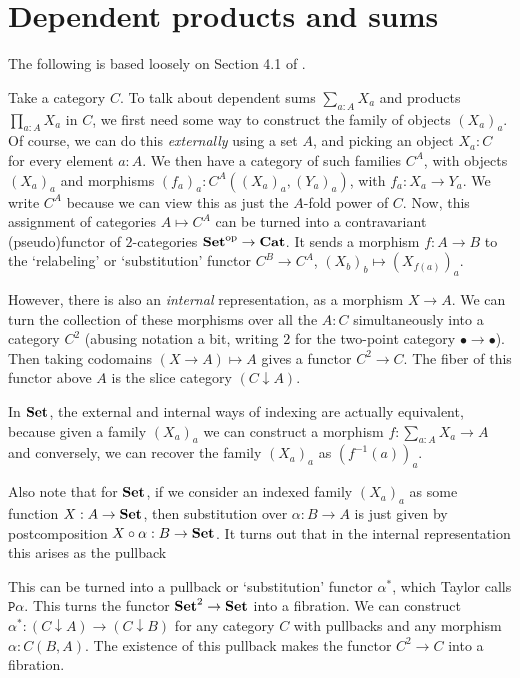 \section{Dependent products and sums}\label{sec:dependent-products}
The following is based loosely on Section 4.1 of \cite{taylor}.

Take a category $ C $. To talk about dependent sums $ \sum_{a: A} X_a $ and products $ \prod_{a: A} X_a $ in $ C $, we first need some way to construct the family of objects $ (X_a)_a $. Of course, we can do this \textit{externally} using a set $ A $, and picking an object $ X_a : C $ for every element $ a : A $. We then have a category of such families $ C^A $, with objects $ (X_a)_a $ and morphisms $ (f_a)_a: C^A((X_a)_a, (Y_a)_a) $, with $ f_a: X_a \to Y_a $. We write $ C^A $ because we can view this as just the $ A $-fold power of $ C $. Now, this assignment of categories $ A \mapsto C^A $ can be turned into a contravariant (pseudo)functor of $ 2 $-categories $ \mathbf{Set}^{\text{op}} \to \mathbf{Cat} $. It sends a morphism $ f: A \to B $ to the `relabeling' or `substitution' functor $ C^B \to C^A $, $ (X_b)_b \mapsto (X_{f(a)})_a $.

However, there is also an \textit{internal} representation, as a morphism $ X \to A $. We can turn the collection of these morphisms over all the $ A : C $ simultaneously into a category $ C^2 $ (abusing notation a bit, writing $ 2 $ for the two-point category $ \bullet \to \bullet $). Then taking codomains $ (X \to A) \mapsto A $ gives a functor $ C^2 \to C $. The fiber of this functor above $ A $ is the slice category $ (C \downarrow A) $.

In $ \mathbf{Set} $, the external and internal ways of indexing are actually equivalent, because given a family $ (X_a)_a $ we can construct a morphism $ f: \sum_{a : A} X_a \to A $ and conversely, we can recover the family $ (X_a)_a $ as $ (f^{-1}(a))_a $.

Also note that for $ \mathbf{Set} $, if we consider an indexed family $ (X_a)_a $ as some function $ X: A \to \mathbf{Set} $, then substitution over $ \alpha: B \to A $ is just given by postcomposition $ X \circ \alpha: B \to \mathbf{Set} $. It turns out that in the internal representation this arises as the pullback
\begin{center}
\end{center}
This can be turned into a pullback or `substitution' functor $ \alpha^* $, which Taylor calls $ \mathtt{P}\alpha $. This turns the functor $ \mathbf{Set}^2 \to \mathbf{Set} $ into a fibration. We can construct $ \alpha^* : (C \downarrow A) \to (C \downarrow B) $ for any category $ C $ with pullbacks and any morphism $ \alpha: C(B, A) $. The existence of this pullback makes the functor $ C^2 \to C $ into a fibration.

